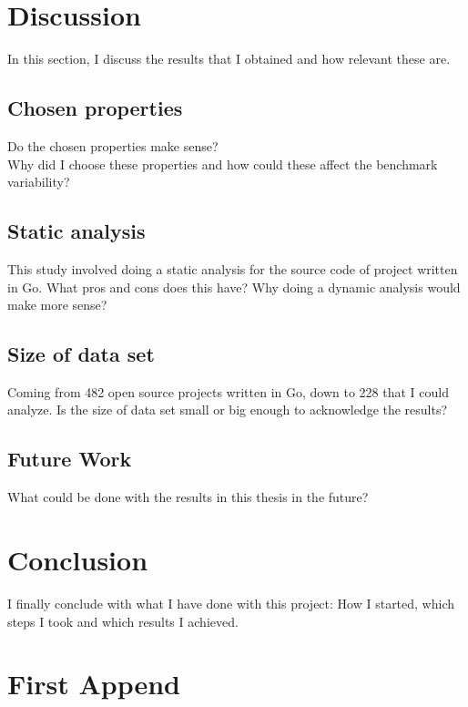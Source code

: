 \documentclass{seal_thesis}
\begin{document}
\chapter{Discussion}
\label{Discussion}
In this section, I discuss the results that I obtained and how relevant these are.
\section{Chosen properties}
Do the chosen properties make sense? \\
Why did I choose these properties and how could these affect the benchmark variability? \\

\section{Static analysis}
This study involved doing a static analysis for the source code of project written in Go. What pros and cons does this have? Why doing a dynamic analysis would make more sense?

\section{Size of data set}
Coming from 482 open source projects written in Go, down to 228 that I could analyze. Is the size of data set small or big enough to acknowledge the results?

\section{Future Work}
What could be done with the results in this thesis in the future?

\chapter{Conclusion}
\label{Conclusion}
I finally conclude with what I have done with this project: How I started, which steps I took and which results I achieved.



\appendix
\chapter{First Append}
\end{document}
